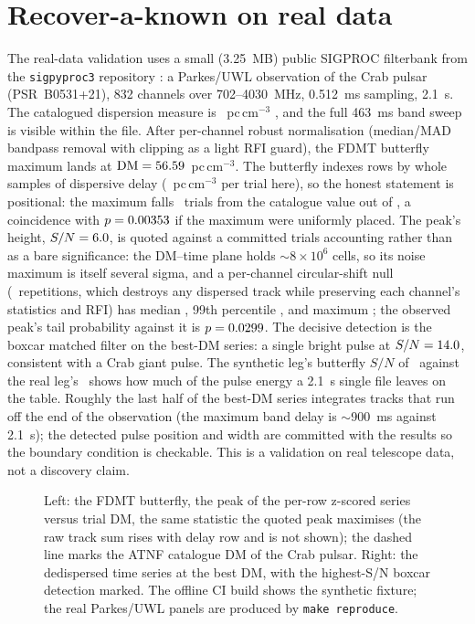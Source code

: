 \documentclass[twocolumn]{aastex631}
\newcommand{\code}[1]{\texttt{#1}}
\begin{document}
\section{Recover-a-known on real data}
The real-data validation uses a small (3.25~MB) public SIGPROC filterbank from the
\code{sigpyproc3} repository \citep{sigpyproc}: a Parkes/UWL observation of the Crab pulsar
(PSR~B0531+21), 832 channels over 702--4030~MHz, 0.512~ms sampling, 2.1~s. The catalogued
dispersion measure is \spCatDm~pc\,cm$^{-3}$ \citep{manchester2005}, and the full 463~ms band sweep
is visible within the file. After per-channel robust normalisation (median/MAD bandpass removal
with clipping as a light RFI guard), the FDMT butterfly maximum lands at
$\mathrm{DM}=56.59$~pc\,cm$^{-3}$. The butterfly indexes rows by whole samples of dispersive
delay (\spRealDmStep~pc\,cm$^{-3}$ per trial here), so the honest statement is positional: the
maximum falls \spRealOffTrials\ trials from the catalogue value out of \spRealTrials, a
coincidence with $p=0.00353$ if the maximum were uniformly placed. The peak's
height, $S/N=6.0$, is quoted against a committed trials accounting rather than as
a bare significance: the DM--time plane holds $\sim$$8\times10^6$ cells, so its noise maximum is
itself several sigma, and a per-channel circular-shift null (\spRealNullReps\ repetitions, which
destroys any dispersed track while preserving each channel's statistics and RFI) has median
\spRealNullMedian, 99th percentile \spRealNullNinetyNine, and maximum \spRealNullMax; the
observed peak's tail probability against it is $p=0.0299$. The decisive detection is the
boxcar matched filter on the best-DM series: a single bright pulse at $S/N=14.0$,
consistent with a Crab giant pulse. The synthetic leg's butterfly $S/N$ of \spSnr\ against the
real leg's \spRealSnr\ shows how much of the pulse energy a 2.1~s single file leaves on the
table. Roughly the last half of the best-DM series integrates tracks that run off the end of
the observation (the maximum band delay is $\sim$900~ms against 2.1~s); the detected pulse
position and width are committed with the results so the boundary condition is checkable. This
is a validation on real telescope data, not a discovery claim.

\begin{figure}
\caption{Left: the FDMT butterfly, the peak of the per-row z-scored series versus trial DM,
the same statistic the quoted peak maximises (the raw track sum rises with delay row and is not
shown); the dashed line marks the ATNF catalogue DM of the Crab pulsar. Right: the dedispersed
time series at the best DM, with the highest-S/N boxcar detection marked. The offline CI build
shows the synthetic fixture; the real Parkes/UWL panels are produced by \code{make reproduce}.}
\label{fig:sp}
\end{figure}
\end{document}

